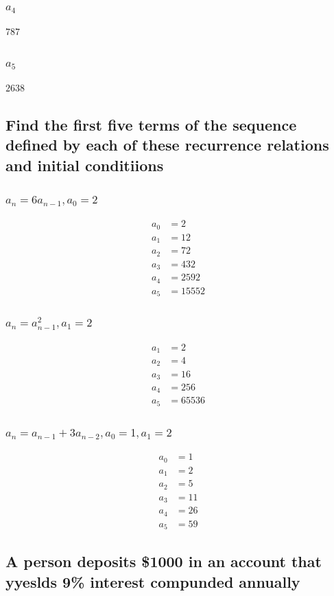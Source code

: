 \documentclass[12pt, a4paper]{report}
\begin{document}
					\subsubsection{$a_4$}
						$787$
					\subsubsection{$a_5$}
						$2638$
				\setcounter{subsection}{8}
				\subsection{Find the first five terms of the sequence defined by each of these recurrence relations and initial conditiions}
					\subsubsection{$a_n=6a_{n-1},a_0=2$}
						\begin{align*}
							a_0&=2\\
							a_1&=12\\
							a_2&=72\\
							a_3&=432\\
							a_4&=2592\\
							a_5&=15552
						\end{align*}
					\subsubsection{$a_n=a_{n-1}^2,a_1=2$}
						\begin{align*}
							a_1&=2\\
							a_2&=4\\
							a_3&=16\\
							a_4&=256\\
							a_5&=65536
						\end{align*}
					\subsubsection{$a_n=a_{n-1}+3a_{n-2},a_0=1,a_1=2$}
						\begin{align*}
							a_0&=1\\
							a_1&=2\\
							a_2&=5\\
							a_3&=11\\
							a_4&=26\\
							a_5&=59
						\end{align*}
				\setcounter{subsection}{17}
				\subsection{A person deposits \$1000 in an account that yyeslds 9\% interest compunded annually}
\end{document}
